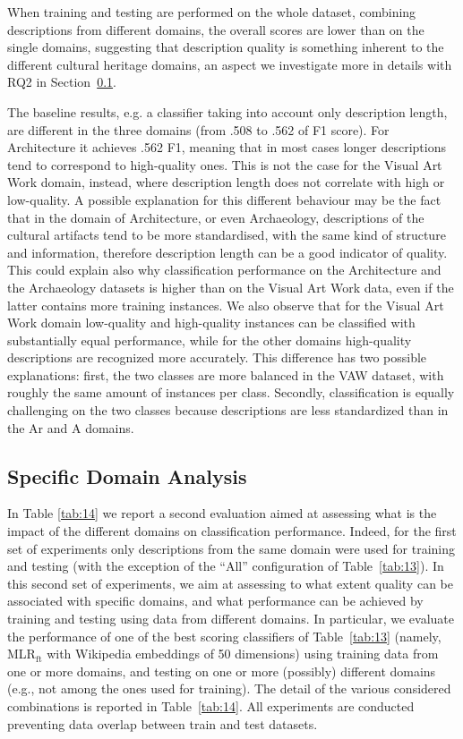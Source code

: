 \documentclass[epsfig,a4paper,12pt,titlepage]{book}
\newcommand{\mlr}{MLR$_\text{ft}$\xspace}
\begin{document}
When training and testing are performed on the whole dataset, combining descriptions from different domains, the overall scores are lower than on the single domains, suggesting that description quality is something inherent to the different cultural heritage domains, an aspect we investigate more in details with RQ2 in Section~\ref{sec:eval:rq2}.

The baseline results, e.g. a classifier taking into account only  description length, are different in the three domains (from .508 to .562 of F1 score). For Architecture it achieves .562 F1, meaning that in most cases longer descriptions tend to correspond to high-quality ones. This is not the case for the Visual Art Work domain, instead, where description length does not correlate with high or low-quality. A possible explanation for this different behaviour may be the fact that in the domain of Architecture, or even Archaeology, descriptions of the cultural artifacts tend to be more standardised, with the same kind of structure and information, therefore description length can be a good indicator of quality. This could explain also why classification performance on the Architecture and the Archaeology datasets is higher than on the Visual Art Work data, even if the latter contains more training instances. We also observe that for the Visual Art Work domain low-quality and high-quality instances can be classified with substantially equal performance, while for the other domains high-quality descriptions are recognized more accurately. This difference has two possible explanations: first, the two classes are more balanced in the VAW dataset, with roughly the same amount of instances per class. Secondly, classification is equally challenging on the two classes because descriptions are less standardized than in the Ar and A domains.

    \subsection{Specific Domain Analysis}
    \label{sec:eval:rq2}


In Table \ref{tab:14} we report a second evaluation aimed at assessing what is the impact of the different domains on classification performance. Indeed, for the first set of experiments only descriptions from the same domain were used for training and testing (with the exception of the ``All'' configuration of Table~\ref{tab:13}). In this second set of experiments, we aim at assessing to what extent quality can be associated with specific domains, and what performance can be achieved by training and testing using data from different domains. In particular, we evaluate the performance of one of the best scoring classifiers of Table~\ref{tab:13} (namely, \mlr with Wikipedia embeddings of 50 dimensions) using training data from one or more domains, and testing on one or more (possibly) different domains (e.g., not among the ones used for training). The detail of the various considered combinations is reported in Table~\ref{tab:14}. All experiments are conducted preventing data overlap between train and test datasets.
\end{document}
